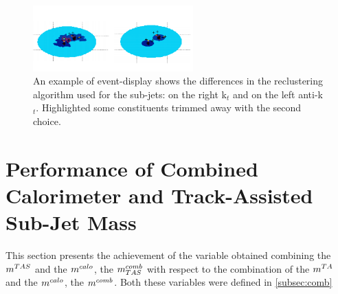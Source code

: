 \begin{figure}[!ht]
  \centering
      \includegraphics[width=0.55\textwidth]{jet_part/mtas/evtdspl.png}
  \caption[Different reclustering in event display]{An example of event-display shows the differences in the reclustering algorithm used for the sub-jets: on the right  k$_t$ and on the left anti-k$_t$. Highlighted some constituents trimmed away with the second choice.}
  \label{fig:evtdspl}
\end{figure}



   

   

   
\newpage
\section{Performance of Combined Calorimeter and Track-Assisted Sub-Jet Mass}
This section presents the achievement of the variable obtained combining the $m^{TAS}$ and the $m^{calo}$, the $m^{comb}_{TAS}$ with respect to the combination of the $m^{TA}$ and the $m^{calo}$, the $m^{comb}$. Both these variables were defined in \ref{subsec:comb}

